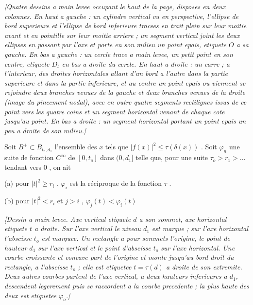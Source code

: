 \begin{center}\emph{[Quatre dessins a main levee occupant le haut de la page, disposes en deux colonnes. En haut a gauche : un cylindre vertical vu en perspective, l'ellipse de bord superieure et l'ellipse de bord inferieure tracees en trait plein sur leur moitie avant et en pointille sur leur moitie arriere ; un segment vertical joint les deux ellipses en passant par l'axe et porte en son milieu un point epais, etiquete $O$ a sa gauche. En bas a gauche : un cercle trace a main levee, un petit point en son centre, etiquete $D_t$ en bas a droite du cercle. En haut a droite : un carre ; a l'interieur, des droites horizontales allant d'un bord a l'autre dans la partie superieure et dans la partie inferieure, et au centre un point epais ou viennent se rejoindre deux branches venues de la gauche et deux branches venues de la droite (image du pincement nodal), avec en outre quatre segments rectilignes issus de ce point vers les quatre coins et un segment horizontal venant de chaque cote jusqu'au point. En bas a droite : un segment horizontal portant un point epais un peu a droite de son milieu.]}\end{center}

Soit $B^+ \subset B_{t_o,d_1}$ l'ensemble des $x$ tels que $|f(x)|^2 \leq \tau(\delta(x))$ . Soit $\varphi_n$ une suite de fonction $C^\infty$ de $[0, t_o]$ dans $(0, d_1]$ telle que, pour une suite $\tau_o > r_1 > \ldots$ tendant vers $0$ , on ait

(a) pour $|t|^2 \geq r_i$ , $\varphi_i$ est la réciproque de la fonction $\tau$ .

(b) pour $|t|^2 < r_i$ et $j > i$ , $\varphi_j(t) < \varphi_i(t)$

\begin{center}\emph{[Dessin a main levee. Axe vertical etiquete $d$ a son sommet, axe horizontal etiquete $t$ a droite. Sur l'axe vertical le niveau $d_1$ est marque ; sur l'axe horizontal l'abscisse $t_o$ est marquee. Un rectangle a pour sommets l'origine, le point de hauteur $d_1$ sur l'axe vertical et le point d'abscisse $t_o$ sur l'axe horizontal. Une courbe croissante et concave part de l'origine et monte jusqu'au bord droit du rectangle, a l'abscisse $t_o$ ; elle est etiquetee $t=\tau(d)$ a droite de son extremite. Deux autres courbes partent de l'axe vertical, a deux hauteurs inferieures a $d_1$, descendent legerement puis se raccordent a la courbe precedente ; la plus haute des deux est etiquetee $\varphi_o$.]}\end{center}


